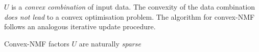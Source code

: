 $U$ is a \emph{convex combination} of input data. The convexity of the data combination \emph{does not lead} to a convex optimisation problem. The algorithm for convex-NMF follows an analogous iterative update procedure. 

Convex-NMF factors $U$ are naturally \emph{sparse}



 


























